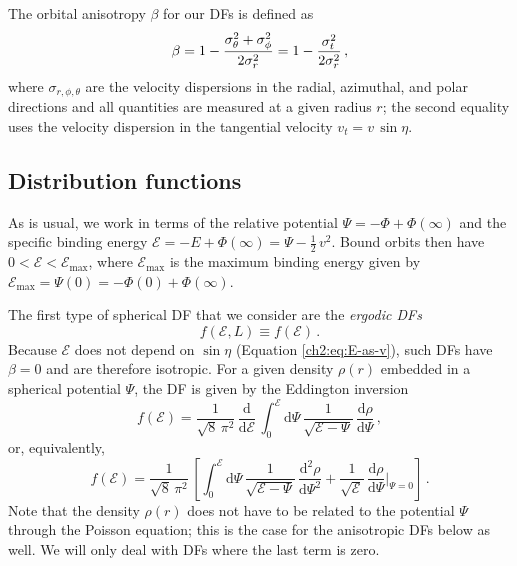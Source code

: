 The orbital anisotropy $\beta$ for our DFs is defined as
\begin{equation}
    \beta = 1-{\sigma_\theta^2+\sigma_\phi^2 \over 2\sigma_r^2} = 1-{\sigma_t^2 \over 2\sigma_r^2}\,,
\end{equation}
where $\sigma_{r,\phi,\theta}$ are the velocity dispersions in the radial, azimuthal, and polar directions and all quantities are measured at a given radius $r$; the second equality uses the velocity dispersion in the tangential velocity $v_t = v\,\sin\eta$.

\subsection{Distribution functions}

As is usual, we work in terms of the relative potential $\Psi = -\Phi+\Phi(\infty)$ and the specific binding energy $\mathcal{E} =  -E +\Phi(\infty) = \Psi -\frac{1}{2}\,v^2$. Bound orbits then have $0 < \mathcal{E} < \mathcal{E}_{\mathrm{max}}$, where $\mathcal{E}_{\mathrm{max}}$ is the maximum binding energy given by $\mathcal{E}_{\mathrm{max}} = \Psi(0) = -\Phi(0)+\Phi(\infty)$.

The first type of spherical DF that we consider are the \emph{ergodic DFs}
\begin{equation}
    f(\mathcal{E},L) \equiv f(\mathcal{E})\,.
\end{equation}
Because $\mathcal{E}$ does not depend on $\sin\eta$ (Equation \ref{ch2:eq:E-as-v}), such DFs have $\beta=0$ and are therefore isotropic. For a given density $\rho(r)$ embedded in a spherical potential $\Psi$, the DF is given by the Eddington inversion \parencite{eddington16}
\begin{equation}\label{ch2:eq-eddington-alt}
    f(\mathcal{E}) = \frac{1}{\sqrt{8}\,\pi^2}\,\frac{\mathrm{d}}{\mathrm{d}\mathcal{E}}\,\int_0^\mathcal{E}\mathrm{d}\Psi\,\frac{1}{\sqrt{\mathcal{E}-\Psi}}\,\frac{\mathrm{d}\rho}{\mathrm{d}\Psi}\,,
\end{equation}
or, equivalently,
\begin{equation}\label{ch2:eq-eddington}
    f(\mathcal{E}) = \frac{1}{\sqrt{8}\,\pi^2}\,\left[\int_0^\mathcal{E}\mathrm{d}\Psi\,\frac{1}{\sqrt{\mathcal{E}-\Psi}}\,\frac{\mathrm{d}^2\rho}{\mathrm{d}\Psi^2} +\frac{1}{\sqrt{\mathcal{E}}}\,\frac{\mathrm{d}\rho}{\mathrm{d}\Psi}\Bigg|_{\Psi=0}\right]\,.
\end{equation}
Note that the density $\rho(r)$ does not have to be related to the potential $\Psi$ through the Poisson equation; this is the case for the anisotropic DFs below as well. We will only deal with DFs where the last term is zero.

